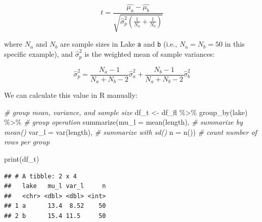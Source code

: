 \documentclass[
]{book}
\newenvironment{Shaded}{\begin{snugshade}}{\end{snugshade}}
\newcommand{\AttributeTok}[1]{\textcolor[rgb]{0.77,0.63,0.00}{#1}}
\newcommand{\CommentTok}[1]{\textcolor[rgb]{0.56,0.35,0.01}{\textit{#1}}}
\newcommand{\FunctionTok}[1]{\textcolor[rgb]{0.00,0.00,0.00}{#1}}
\newcommand{\NormalTok}[1]{#1}
\newcommand{\OtherTok}[1]{\textcolor[rgb]{0.56,0.35,0.01}{#1}}
\newcommand{\SpecialCharTok}[1]{\textcolor[rgb]{0.00,0.00,0.00}{#1}}
\begin{document}
\[
t = \frac{\hat{\mu_a} - \hat{\mu_b}}{\sqrt{\hat{\sigma}^2_p \left(\frac{1}{N_a} + \frac{1}{N_b}\right)}}
\]

where \(N_a\) and \(N_b\) are sample sizes in Lake \texttt{a} and \texttt{b} (i.e., \(N_a = N_b = 50\) in this specific example), and \(\hat{\sigma}^2_p\) is the weighted mean of sample variances:

\[
\hat{\sigma}^2_p = \frac{N_a-1}{N_a + N_b - 2}\hat{\sigma}^2_a + \frac{N_b-1}{N_a + N_b - 2}\hat{\sigma}^2_b
\]

We can calculate this value in R manually:

\begin{Shaded}
\begin{Highlighting}[]
\CommentTok{\# group mean, variance, and sample size}
\NormalTok{df\_t }\OtherTok{\textless{}{-}}\NormalTok{ df\_fl }\SpecialCharTok{\%\textgreater{}\%} 
  \FunctionTok{group\_by}\NormalTok{(lake) }\SpecialCharTok{\%\textgreater{}\%} \CommentTok{\# group operation}
  \FunctionTok{summarize}\NormalTok{(}\AttributeTok{mu\_l =} \FunctionTok{mean}\NormalTok{(length), }\CommentTok{\# summarize by mean()}
            \AttributeTok{var\_l =} \FunctionTok{var}\NormalTok{(length), }\CommentTok{\# summarize with sd()}
            \AttributeTok{n =} \FunctionTok{n}\NormalTok{()) }\CommentTok{\# count number of rows per group}

\FunctionTok{print}\NormalTok{(df\_t)}
\end{Highlighting}
\end{Shaded}

\begin{verbatim}
## # A tibble: 2 x 4
##   lake   mu_l var_l     n
##   <chr> <dbl> <dbl> <int>
## 1 a      13.4  8.52    50
## 2 b      15.4 11.5     50
\end{verbatim}
\end{document}

